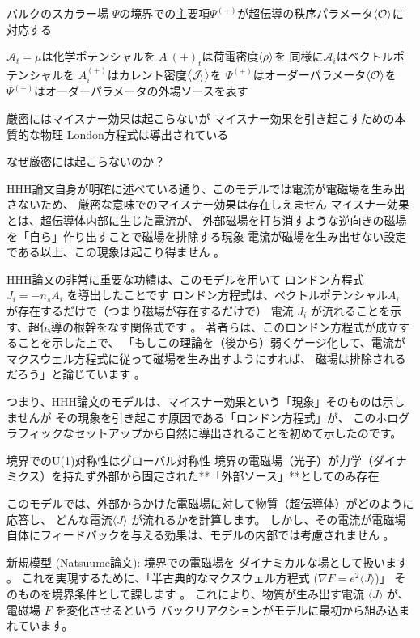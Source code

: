\documentclass[b5paper,11pt,dvipdfmx]{jsarticle}
\numberwithin{equation}{section}
\theoremstyle{definition}
\begin{document}
バルクのスカラー場
$\Psi$の境界での主要項$\Psi^{(+)}$が超伝導の秩序パラメータ$\ev{\mathcal{O}}$に対応する


$\mathcal{A}_t = \mu$は化学ポテンシャルを
$A~{(+)}_t$は荷電密度$\ev{\rho}$を
同様に$\mathcal{A}_i$はベクトルポテンシャルを
$A^{(+)}_i$はカレント密度$\ev{\mathcal{J_i}}$を
$\Psi^{(+)}$はオーダーパラメータ$\ev{\mathcal{O}}$を
$\Psi^{(-)}$はオーダーパラメータの外場ソースを表す










厳密にはマイスナー効果は起こらないが
マイスナー効果を引き起こすための本質的な物理
London方程式は導出されている

なぜ厳密には起こらないのか？

HHH論文自身が明確に述べている通り、このモデルでは電流が電磁場を生み出さないため、
厳密な意味でのマイスナー効果は存在しえません
マイスナー効果とは、超伝導体内部に生じた電流が、
外部磁場を打ち消すような逆向きの磁場を「自ら」作り出すことで磁場を排除する現象
電流が磁場を生み出せない設定である以上、この現象は起こり得ません 。

HHH論文の非常に重要な功績は、このモデルを用いて
ロンドン方程式 $J_i = -n_s A_i$ を導出したことです
ロンドン方程式は、ベクトルポテンシャル$A_i$ が存在するだけで（つまり磁場が存在するだけで）
電流 $J_i$ が流れることを示す、超伝導の根幹をなす関係式です 。
著者らは、このロンドン方程式が成立することを示した上で、
「もしこの理論を（後から）弱くゲージ化して、電流がマクスウェル方程式に従って磁場を生み出すようにすれば、
磁場は排除されるだろう」と論じています 。

つまり、HHH論文のモデルは、マイスナー効果という「現象」そのものは示しませんが
その現象を引き起こす原因である「ロンドン方程式」が、
このホログラフィックなセットアップから自然に導出されることを初めて示したのです。





境界でのU(1)対称性はグローバル対称性
境界の電磁場（光子）が力学（ダイナミクス）を持たず外部から固定された**「外部ソース」**としてのみ存在

このモデルでは、外部からかけた電磁場に対して物質（超伝導体）がどのように応答し、
どんな電流$\langle J \rangle$ が流れるかを計算します。
しかし、その電流が電磁場自体にフィードバックを与える効果は、モデルの内部では考慮されません 。

新規模型 (Natsuume論文):
境界での電磁場を
ダイナミカルな場として扱います 。
これを実現するために、「半古典的なマクスウェル方程式 ($\nabla F = e^2 \langle J \rangle$)」
そのものを境界条件として課します 。
これにより、物質が生み出す電流 $\langle J \rangle$ が、電磁場 $F$ を変化させるという
バックリアクションがモデルに最初から組み込まれています。
\end{document}
